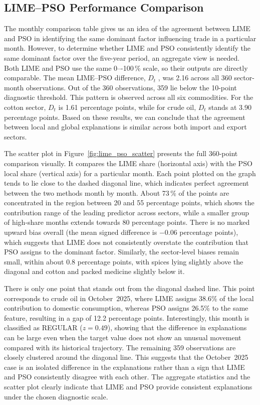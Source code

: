 \documentclass[pdftex,sn-mathphys-num]{sn-jnl}
\begin{document}
\normalsize\medskip
{}
\subsection*{LIME--PSO Performance Comparison}

The monthly comparison table gives us an idea of the agreement between LIME and PSO in identifying the same dominant factor influencing trade in a particular month. However, to determine whether LIME and PSO consistently identify the same dominant factor over the five-year period, an aggregate view is needed. Both LIME and PSO use the same 0–-100\,\% scale, so their outputs are directly comparable. The mean LIME–PSO difference, $D_t$ , was 2.16 across all 360 sector-month observations. Out of the 360 observations, 359 lie below the 10-point diagnostic threshold. This pattern is observed across all six commodities. For the cotton sector, $D_t$ is 1.61 percentage points, while for crude oil, $D_t$ stands at 3.90 percentage points. Based on these results, we can conclude that the agreement between local and global explanations is similar across both import and export sectors.

The scatter plot in Figure~\ref{fig:lime_pso_scatter} presents the full 360-point comparison visually. It compares the LIME share (horizontal axis) with the PSO local share (vertical axis) for a particular month. Each point plotted on the graph tends to lie close to the dashed diagonal line, which indicates perfect agreement between the two methods month by month. About 73\,\% of the points are concentrated in the region between 20 and 55 percentage points, which shows the contribution range of the leading predictor across sectors, while a smaller group of high-share months extends towards 80 percentage points. There is no marked upward bias overall (the mean signed difference is $-0.06$ percentage points), which suggests that LIME does not consistently overstate the contribution that PSO assigns to the dominant factor. Similarly, the sector-level biases remain small, within about 0.8 percentage points, with spices lying slightly above the diagonal and cotton and packed medicine slightly below it.

There is only one point that stands out from the diagonal dashed line. This point corresponds to crude oil in October~2025, where LIME assigns 38.6\% of the local contribution to domestic consumption, whereas PSO assigns 26.5\% to the same feature, resulting in a gap of 12.2 percentage points. Interestingly, this month is classified as REGULAR ($z = 0.49$), showing that the difference in explanations can be large even when the target value does not show an unusual movement compared with its historical trajectory. The remaining 359 observations are closely clustered around the diagonal line. This suggests that the October~2025 case is an isolated difference in the explanations rather than a sign that LIME and PSO consistently disagree with each other. The aggregate statistics and the scatter plot clearly indicate that LIME and PSO provide consistent explanations under the chosen diagnostic scale.
\end{document}
